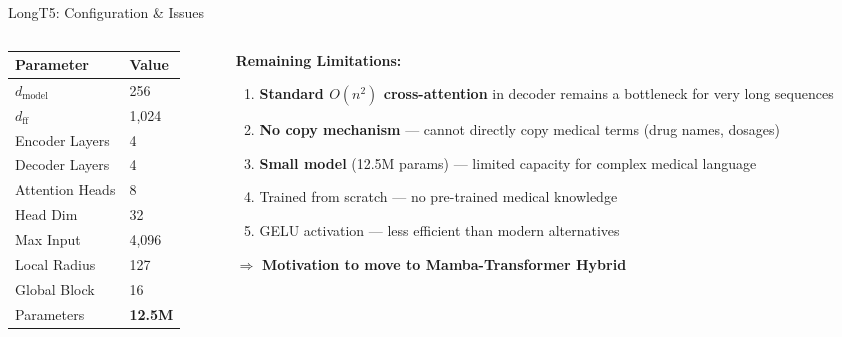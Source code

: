 \documentclass[10pt, aspectratio=169]{beamer}
\begin{document}
\begin{frame}{LongT5: Configuration \& Issues}
  \begin{columns}[T]
    \begin{column}{0.42\textwidth}
      \begin{table}
        \centering
        \small
        \begin{tabular}{ll}
          \toprule
          \textbf{Parameter} & \textbf{Value} \\
          \midrule
          $d_{\text{model}}$ & 256 \\
          $d_{\text{ff}}$ & 1,024 \\
          Encoder Layers & 4 \\
          Decoder Layers & 4 \\
          Attention Heads & 8 \\
          Head Dim & 32 \\
          Max Input & 4,096 \\
          Local Radius & 127 \\
          Global Block & 16 \\
          Parameters & \textbf{12.5M} \\
          \bottomrule
        \end{tabular}
      \end{table}
    \end{column}
    \begin{column}{0.55\textwidth}
      \textbf{Remaining Limitations:}
      \begin{enumerate}
        \item \textcolor{amber}{\textbf{Standard $O(n^2)$ cross-attention}} in decoder remains a bottleneck for very long sequences
        \item \textcolor{amber}{\textbf{No copy mechanism}} --- cannot directly copy medical terms (drug names, dosages)
        \item \textcolor{amber}{\textbf{Small model}} (12.5M params) --- limited capacity for complex medical language
        \item Trained from scratch --- no pre-trained medical knowledge
        \item GELU activation --- less efficient than modern alternatives
      \end{enumerate}

      \vspace{0.2cm}
      $\Rightarrow$ \textbf{Motivation to move to Mamba-Transformer Hybrid}
    \end{column}
  \end{columns}
\end{frame}
\end{document}
